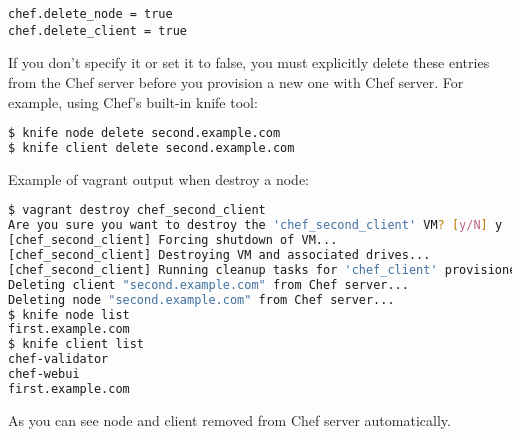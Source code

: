 \begin{lstlisting}[label=lst:my-server-cloud-node8]
chef.delete_node = true
chef.delete_client = true
\end{lstlisting}

If you don't specify it or set it to false, you must explicitly delete these entries from the Chef server before you provision a new one with Chef server. For example, using Chef's built-in knife tool:

\begin{lstlisting}[language=Bash,label=lst:my-server-cloud-node9]
$ knife node delete second.example.com
$ knife client delete second.example.com
\end{lstlisting}

Example of vagrant output when destroy a node:

\begin{lstlisting}[language=Bash,label=lst:my-server-cloud-node11]
$ vagrant destroy chef_second_client
Are you sure you want to destroy the 'chef_second_client' VM? [y/N] y
[chef_second_client] Forcing shutdown of VM...
[chef_second_client] Destroying VM and associated drives...
[chef_second_client] Running cleanup tasks for 'chef_client' provisioner...
Deleting client "second.example.com" from Chef server...
Deleting node "second.example.com" from Chef server...
$ knife node list
first.example.com
$ knife client list
chef-validator
chef-webui
first.example.com
\end{lstlisting}

As you can see node and client removed from Chef server automatically.
